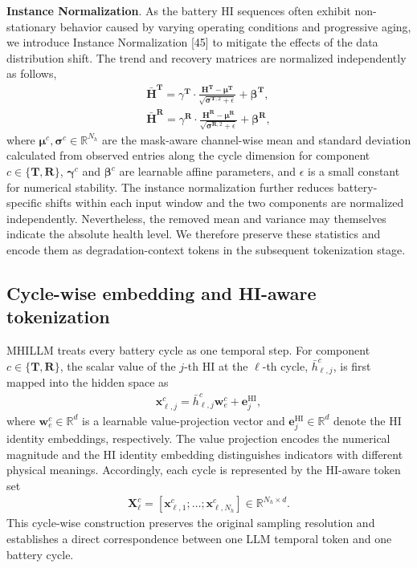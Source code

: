 \documentclass[preprint,12pt]{elsarticle}
\begin{document}
\textbf{Instance Normalization}.  
As the battery HI sequences often exhibit non-stationary behavior caused by varying operating conditions and progressive aging, we introduce Instance Normalization [45] to mitigate the effects of the data distribution shift. The trend and recovery matrices are normalized independently as follows,
\begin{gather}
\bar{\mathbf{H}}^{\mathbf{T}} = \gamma^{\mathbf{T}} \cdot \frac{\mathbf{H}^{\mathbf{T}} - \boldsymbol{\mu}^{\mathbf{T}}}{\sqrt{\boldsymbol{\sigma}^{\mathbf{T},2} + \epsilon}} + \boldsymbol{\beta}^{\mathbf{T}},   \\
\bar{\mathbf{H}}^{\mathbf{R}} = \gamma^{\mathbf{R}} \cdot \frac{\mathbf{H}^{\mathbf{R}} - \boldsymbol{\mu}^{\mathbf{R}}}{\sqrt{\boldsymbol{\sigma}^{\mathbf{R},2} + \epsilon}} + \boldsymbol{\beta}^{\mathbf{R}}, 
\end{gather}
where $\boldsymbol{\mu}^{c},\boldsymbol{\sigma}^{c}\in\mathbb{R}^{N_h}$ are the mask-aware channel-wise mean and standard deviation calculated from observed entries along the cycle dimension for component $c\in\{\mathbf{T},\mathbf{R}\}$, $\boldsymbol{\gamma}^{c}$ and $\boldsymbol{\beta}^{c}$ are learnable affine parameters, and $\epsilon$ is a small constant for numerical stability. The instance normalization further reduces battery-specific shifts within each input window and the two components are normalized independently. Nevertheless, the removed mean and variance may themselves indicate the absolute health level. We therefore preserve these statistics and encode them as degradation-context tokens in the subsequent tokenization stage. 

\subsection{Cycle-wise embedding and HI-aware tokenization}
MHILLM treats every battery cycle as one temporal step. For component $c\in\{\mathbf{T},\mathbf{R}\}$, the scalar value of the $j$-th HI at the $\ell$-th cycle, $\bar{h}_{\ell,j}^{c}$, is first mapped into the hidden space as
\begin{gather}
\mathbf{x}_{\ell,j}^{c}
=\bar{h}_{\ell,j}^{c}\mathbf{w}_{e}^{c}
+\mathbf{e}_{j}^{\mathrm{HI}},
\end{gather}
where $\mathbf{w}_{e}^{c}\in\mathbb{R}^{d}$ is a learnable value-projection vector and $\mathbf{e}_{j}^{\mathrm{HI}} \in \mathbb{R}^{d}$ denote the HI identity embeddings, respectively. The value projection encodes the numerical magnitude and the HI identity embedding distinguishes indicators with different physical meanings. Accordingly, each cycle is represented by the HI-aware token set
\begin{gather}
\mathbf{X}_{\ell}^{c}
=[\mathbf{x}_{\ell,1}^{c};\ldots;\mathbf{x}_{\ell,N_h}^{c}]
\in\mathbb{R}^{N_h\times d}.
\end{gather}
This cycle-wise construction preserves the original sampling resolution and establishes a direct correspondence between one LLM temporal token and one battery cycle.
\end{document}
